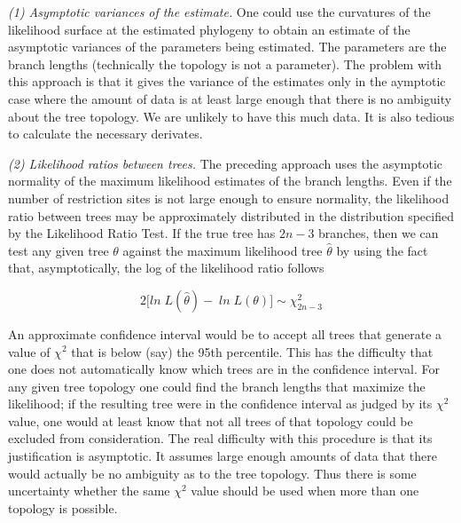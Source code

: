 {\it (1) Asymptotic variances of the estimate.} One could use the curvatures of the
likelihood surface at the estimated phylogeny to obtain an estimate of the
asymptotic variances of the parameters being estimated.  The parameters are
the branch lengths (technically the topology is not a parameter).  The
problem with this approach is that it gives the variance of the estimates
only in the aymptotic case where the amount of data is at least large
enough that there is no ambiguity about the tree topology.  We are unlikely
to have this much data.  It is also tedious to calculate the necessary
derivates.

{\it (2) Likelihood ratios between trees.}  The preceding approach uses the
asymptotic normality of the maximum likelihood estimates of the branch
lengths.  Even if the number of restriction sites is not large enough to
ensure normality, the likelihood ratio between trees may be approximately
distributed in the distribution specified by the Likelihood Ratio Test.  If
the true tree has $2n-3$ branches, then we can test any given tree $\theta$ against
the maximum likelihood tree ${\hat \theta}$ by using the fact that, asymptotically,
the log of the likelihood ratio follows

\begin{equation} %
2 \bigl[ln\;L({\hat\theta}) - \;ln\;L(\theta) \bigr] \sim {\chi^2_{2n-3}}
\end{equation}

An approximate confidence interval would be to accept all trees that
generate a value of $\chi^2$ that is below (say) the 95th percentile.  This
has the difficulty that one does not automatically know which trees
are in the confidence interval.  For any given tree topology one could find the
branch lengths that maximize the likelihood; if the resulting tree were
in the confidence interval as judged by its $\chi^2$ value, one would at
least know that not all trees of that topology could be excluded from
consideration.  The real difficulty with this procedure is that its
justification is asymptotic.  It assumes large enough amounts of data that
there would actually be no ambiguity as to the tree topology.  Thus there
is some uncertainty whether the same $\chi^2$ value should be used when
more than one topology is possible.


